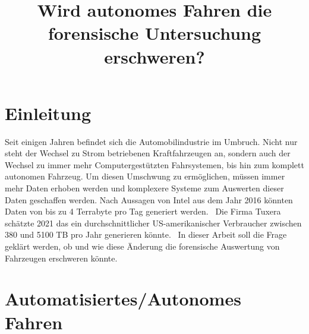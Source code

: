 \documentclass[conference,compsoc,final,a4paper]{IEEEtran}
\newcommand{\autoren}[0]{Gleumes, Folke Henning}
\newcommand{\dokumententitel}[0]{Wird autonomes Fahren die forensische Untersuchung erschweren?}
\begin{document}
\title{\dokumententitel}

\author{
  \IEEEauthorblockN{\autoren}
}

\maketitle
\thispagestyle{plain}
\pagestyle{plain}

\begin{abstract}
\end{abstract}

{\small\tableofcontents}

\section{Einleitung}

Seit einigen Jahren befindet sich die Automobilindustrie im Umbruch. Nicht nur steht der Wechsel zu Strom betriebenen Kraftfahrzeugen an,
sondern auch der Wechsel zu immer mehr Computergestützten Fahrsystemen, bis hin zum komplett autonomen Fahrzeug.
Um diesen Umschwung zu ermöglichen, müssen immer mehr Daten erhoben werden und komplexere Systeme zum Auswerten dieser Daten geschaffen werden.
Nach Aussagen von Intel aus dem Jahr 2016 könnten Daten von bis zu 4 Terrabyte pro Tag generiert werden.~\cite{Nelson2016}
Die Firma Tuxera schätzte 2021 das ein durchschnittlicher US-amerikanischer Verbraucher zwischen 380 und 5100 TB pro Jahr generieren könnte.~\cite{Wright2021}
In dieser Arbeit soll die Frage geklärt werden, ob und wie diese Änderung die forensische Auswertung von Fahrzeugen erschweren könnte.

\section{Automatisiertes/Autonomes Fahren}

\end{document}

